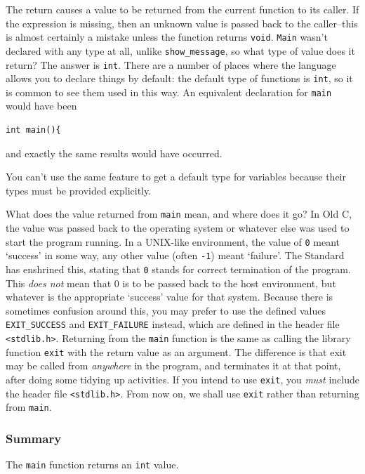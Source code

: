    The return causes a value to be returned from the current function to its
    caller. If the expression is missing, then an unknown value is passed back
    to the caller--this is almost certainly a mistake unless the function
    returns \texttt{void}. \texttt{Main} wasn't declared with any type
    at all, unlike \texttt{show\_message}, so what type of value does it
    return? The answer is \texttt{int}. There are a number of places where
    the language allows you to declare things by default: the default type of
    functions is \texttt{int}, so it is common to see them used in this
    way. An equivalent declaration for \texttt{main} would have been


   \begin{Verbatim}
int main(){
\end{Verbatim}

   and exactly the same results would have occurred.


   You can't use the same feature to get a default type for variables
    because their types must be provided explicitly.


   What does the value returned from \texttt{main} mean, and where does
    it go? In Old C, the value was passed back to the operating system or
    whatever else was used to start the program running. In a UNIX-like
    environment, the value of \texttt{0} meant `success' in some way,
    any other value (often \texttt{-1}) meant `failure'. The Standard
    has enshrined this, stating that \texttt{0} stands for correct
    termination of the program. This \textit{does not} mean that 0 is to be
    passed back to the host environment, but whatever is the appropriate
    `success' value for that system. Because there is sometimes confusion
    around this, you may prefer to use the defined values
    \texttt{EXIT\_SUCCESS} and \texttt{EXIT\_FAILURE} instead, which are
    defined in the header file \texttt{<stdlib.h>}. Returning from
    the \texttt{main} function is the same as calling the library function
    \texttt{exit} with the return value as an argument. The difference is
    that exit may be called from \textit{anywhere} in the program, and
    terminates it at that point, after doing some tidying up activities. If you
    intend to use \texttt{exit}, you \textit{must} include the header file
    \texttt{<stdlib.h>}. From now on, we shall use \texttt{exit}
    rather than returning from \texttt{main}.


   \subsubsection{Summary}
    The \texttt{main} function returns an \texttt{int} value.

